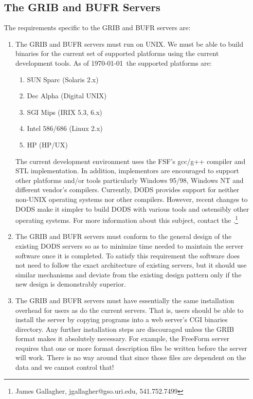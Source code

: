 \documentclass[12pt]{article}
\begin{document}
\subsection{The GRIB and BUFR Servers}

The requirements specific to the GRIB and BUFR servers are:

\begin{enumerate}
  
\item The GRIB and BUFR servers must run on UNIX. We must be able to build
  binaries for the current set of supported platforms using the current
  development tools. As of \today\ the supported platforms are: 

  \begin{enumerate}

  \item SUN Sparc (Solaris 2.x)
  \item Dec Alpha (Digital UNIX)
  \item SGI Mips (IRIX 5.3, 6.x)
  \item Intel 586/686 (Linux 2.x)
  \item HP (HP/UX)

  \end{enumerate}
  
  The current development environment uses the FSF's gcc/g++ compiler and STL
  implementation. In addition, implementors are encouraged to support other
  platforms and/or tools particularly Windows 95/98, Windows NT and different
  vendor's compilers.  Currently, DODS provides support for neither non-UNIX
  operating systems nor other compilers. However, recent changes to DODS make
  it simpler to build DODS with various tools and ostensibly other operating
  systems. For more information about this subject, contact the
  .\footnote{James Gallagher,
    jgallagher@gso.uri.edu, 541.752.7499}
  
\item The GRIB and BUFR servers must conform to the general design of the
  existing DODS servers so as to minimize time needed to maintain the server
  software once it is completed. To satisfy this requirement the software
  does not need to follow the exact architecture of existing servers, but it
  should use similar mechanisms and deviate from the existing design pattern
  only if the new design is demonstrably superior.
  
\item The GRIB and BUFR servers must have essentially the same
  installation overhead for users as do the current servers. That is, users
  should be able to install the server by copying programs into a web
  server's CGI binaries directory. Any further installation steps are
  discouraged unless the GRIB format makes it absolutely necessary. For
  example, the FreeForm server requires that one or more format description
  files be written before the server will work. There is no way around that
  since those files are dependent on the data and we cannot control that!

\end{enumerate}
\end{document}
